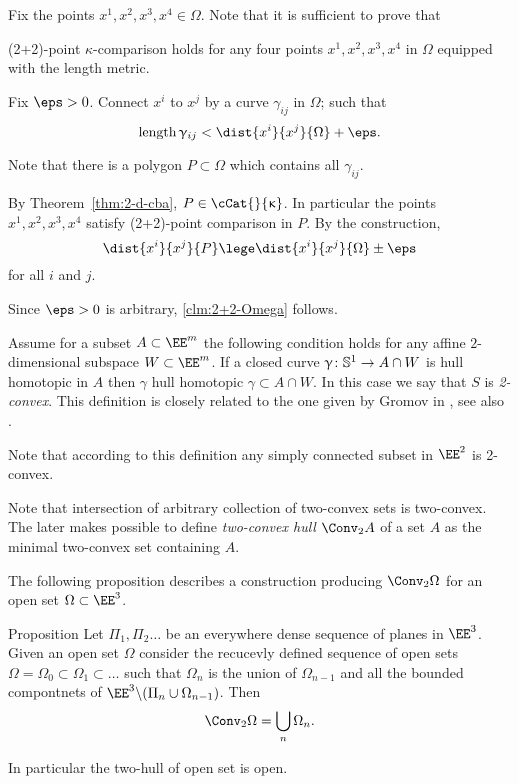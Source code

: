 Fix the points $x^1,x^2,x^3,x^4\in\Omega$.
Note that it is sufficient to prove that 
\begin{clm}{}\label{clm:2+2-Omega}
(2+2)-point $\kappa$-comparison holds for any four points 
$x^1, x^2, x^3, x^4$ in $\Omega$ 
equipped with the length metric.
\end{clm}

Fix $\eps>0$.
Connect $x^i$ to $x^j$ by a curve $\gamma_{ij}$ in $\Omega$;
such that 
\[\length\gamma_{ij}<\dist{x^i}{x^j}{\Omega}+\eps.\]

Note that there is a polygon $P\subset \Omega$ 
which contains all $\gamma_{ij}$.

By Theorem~\ref{thm:2-d-cba}, $P\in \cCat{}{\kappa}$.
In particular the points  $x^1,x^2,x^3,x^4$ satisfy (2+2)-point comparison in $P$.
By the construction,
\[\dist{x^i}{x^j}{P}\lege \dist{x^i}{x^j}{\Omega}\pm\eps\]
for all $i$ and $j$.

Since $\eps>0$ is arbitrary, \ref{clm:2+2-Omega} follows.
\qeds

Assume for a subset $A\subset \EE^m$
the following condition holds for any affine $2$-dimensional subspace $W\subset\EE^m$.
If a closed curve $\gamma\:\SS^1\to A\cap W$ is hull homotopic in $A$
then $\gamma$ 
hull homotopic $\gamma\subset A\cap W$.
In this case we say that $S$ is \emph{2-convex}.
This definition is closely related to the one given by Gromov in \cite[\S\textonehalf]{gromov:SaGMC}, see also \cite{panov-petrunin:sweeping}.

Note that according to this definition any simply connected subset in $\EE^2$ is 2-convex.

Note that intersection of arbitrary collection of  two-convex sets is two-convex.
The later makes possible to define \emph{two-convex hull} $\Conv_2 A$ of a set $A$
as the minimal two-convex set containing $A$.

The following proposition describes a construction producing $\Conv_2 \Omega$ for an open set $\Omega\subset\EE^3$.

\begin{thm}{Proposition}\label{prop:2-conv-construction}
Let $\Pi_1,\Pi_2\dots$ be an everywhere dense
sequence of planes in $\EE^3$.
Given an open set $\Omega$ consider 
the recucevly defined sequence of open sets 
$\Omega=\Omega_0\subset\Omega_1\subset\dots$ 
such that 
$\Omega_n$ is the union of $\Omega_{n-1}$ 
and all the bounded compontnets of 
$\EE^3\backslash(\Pi_n\cup \Omega_{n-1})$.
Then 
\[\Conv_2\Omega=\bigcup_n\Omega_n.\]

In particular the two-hull of open set is open.
\end{thm}

